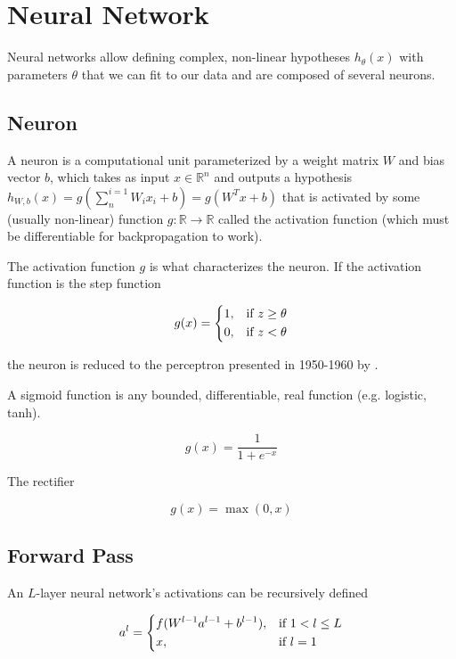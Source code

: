 \section{Neural Network}

Neural networks allow defining complex, non-linear hypotheses $h_\theta(x)$ with parameters $\theta$ that we can fit to our data and are composed of several neurons.

\subsection{Neuron}

A neuron is a computational unit parameterized by a weight matrix $W$ and bias vector $b$, which takes as input $x \in \mathbb{R}^{n}$ and outputs a hypothesis $h_{W,b}(x) = g(\sum^{i=1}_{n} W_{i}x_{i} + b) = g(W^Tx + b)$ that is activated by some (usually non-linear) function $g \colon \mathbb{R} \to \mathbb{R}$ called the activation function (which must be differentiable for backpropagation to work).

The activation function $g$ is what characterizes the neuron. If the activation function is the step function

$$
g(x) =
\begin{dcases}
    1,& \text{if } z \geq \theta\\
    0,& \text{if } z < \theta
\end{dcases}
$$

the neuron is reduced to the perceptron presented in 1950-1960 by \citeauthor{perceptron} \cite{perceptron}.

A sigmoid function is any bounded, differentiable, real function (e.g. logistic, tanh).

$$
g(x) = \frac{1}{1 + e^{-x}}
$$

The rectifier

$$
g(x) = \max(0, x)
$$

\subsection{Forward Pass}
\label{subsection:forwardpass}

An $L$-layer neural network's activations can be recursively defined

$$
a^{l} =
\begin{dcases}
    f(W^{l-1}a^{l-1} + b^{l-1}),& \text{if } 1 < l \leq L\\
    x,              & \text{if } l = 1
\end{dcases}
$$

